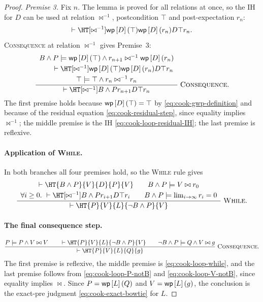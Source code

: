 \begin{proof}
\noindent\emph{Premise 3.}
Fix $n$.  The lemma is proved for all relations at once, so the IH for $D$
can be used at relation $\bowtie^{-1}$, postcondition $\top$ and
post-expectation $r_n$:
\begin{equation}
  \vdash\HT[\rel^{-1}]{\WP{D}{\top}}{\WP{D}{r_n}}{D}{\top}{r_n}.
  \label{eq:cook-loop-residual-IH}
\end{equation}
\textsc{Consequence} at relation $\bowtie^{-1}$ gives Premise~3:
\begin{equation}
\frac{
  \begin{array}{c}
    B\land P\models\WP{D}{\top}\land r_{n+1}\mathrel{\bowtie^{-1}}\WP{D}{r_n}
    \\[1mm]
    \qquad
    \vdash\HT[\rel^{-1}]{\WP{D}{\top}}{\WP{D}{r_n}}{D}{\top}{r_n}
    \\[1mm]
    \top\models\top\land r_n\mathrel{\bowtie^{-1}}r_n
  \end{array}
}{
  \vdash\HT[\rel^{-1}]{B\land P}{r_{n+1}}{D}{\top}{r_n}
}\;\textsc{Consequence}.
\label{eq:cook-loop-residual-conseq}
\end{equation}
The first premise holds because $\mathsf{wp}\left[{D}\right]\left({\top}\right)=\top$ by
\eqref{eq:cook-gwp-definition} and because of the residual equation
\eqref{eq:cook-residual-step}, since equality implies $\bowtie^{-1}$; the
middle premise is the IH \eqref{eq:cook-loop-residual-IH}; the last premise is
reflexive.

\paragraph{Application of \textsc{While}.}
In both branches all four premises hold, so the \textsc{While} rule gives
\begin{equation}
\frac{
  \begin{array}{c}
    \vdash\HT{B\land P}{V}{D}{P}{V}
    \qquad
    B\land P\models V\bowtie r_0
    \\[1mm]
    \forall i\geq0.\ \vdash\HT[\rel^{-1}]{B\land P}{r_{i+1}}{D}{\top}{r_i}
    \qquad
    B\land P\models\lim_{i\to\infty}r_i=0
  \end{array}
}{
  \vdash\HT{P}{V}{L}{\neg B\land P}{V}
}\;\textsc{While}.
\label{eq:cook-loop-while}
\end{equation}

\paragraph{The final consequence step.}
\begin{equation}
\frac{
  P\models P\land V\bowtie V
  \qquad
  \vdash\HT{P}{V}{L}{\neg B\land P}{V}
  \qquad
  \neg B\land P\models Q\land V\bowtie g
}{
  \vdash\HT{P}{V}{L}{Q}{g}
}\;\textsc{Consequence}.
\label{eq:cook-loop-final-conseq}
\end{equation}
The first premise is reflexive, the middle premise is
\eqref{eq:cook-loop-while}, and the last premise follows from
\eqref{eq:cook-loop-P-notB} and \eqref{eq:cook-loop-V-notB}, since equality
implies $\bowtie$.  Since $P=\mathsf{wp}\left[{L}\right]\left({Q}\right)$ and $V=\mathsf{wp}\left[{L}\right]\left({g}\right)$, the conclusion is
the exact-pre judgment \eqref{eq:cook-exact-bowtie} for $L$.
\end{proof}

